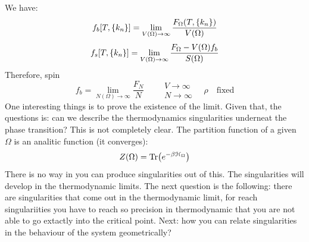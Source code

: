 \documentclass[../main/main.tex]{subfiles}
\begin{document}
We have:
\begin{equation}
  f_b [T,\qty{k_n} ] = \lim_{V(\Omega )\rightarrow \infty } \frac{F_\Omega (T, \qty{k_n} )}{V(\Omega )}
  \label{eq:}
\end{equation}
\begin{equation}
  f_s [T,\qty{k_n} ] = \lim_{V(\Omega )\rightarrow \infty } \frac{F_\Omega - V (\Omega ) f_b}{S(\Omega )}
  \label{eq:}
\end{equation}
Therefore, spin
\begin{equation}
  f_b = \lim_{N(\Omega)\rightarrow \infty } \frac{F_N}{N} \qquad \substack{V \rightarrow \infty  \\ N \rightarrow \infty } \quad \rho \quad \text{fixed}
  \label{eq:}
\end{equation}
One interesting things is to prove the existence of the limit. Given that, the questions is: can we describe the thermodynamics singularities underneat the phase transition? This is not completely clear. The partition function of a given \( \Omega  \) is an analitic function (it converges):
\begin{equation}
  Z (\Omega ) = \Tr(e^{-\beta \mathcal{H}_\Omega} )
  \label{eq:}
\end{equation}
There is no way in you can produce singularities out of this. The singularities will develop in the thermodynamic limits.
The next question is the following: there are singularities that come out in the thermodynamic limit, for reach singulariities you have to reach so precision in thermodynamic that you are not able to go extactly into the critical point. Next: how you can relate singularities in the behaviour of the system geometrically?
\end{document}
